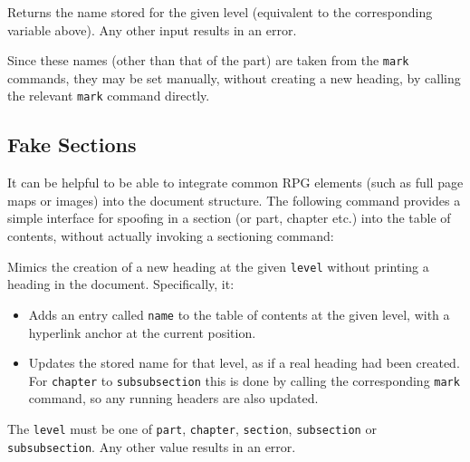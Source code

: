 

			{
				Returns the name stored for the given level (equivalent to the corresponding variable above). Any other input results in an error.

				Since these names (other than that of the part) are taken from the \texttt{mark} commands, they may be set manually, without creating a new heading, by calling the relevant \texttt{mark} command directly.
			}

		\subsection{Fake Sections}

			It can be helpful to be able to integrate common RPG elements (such as full page maps or images) into the document structure. The following command provides a simple interface for spoofing in a section (or part, chapter etc.) into the table of contents, without actually invoking a sectioning command:

			{
				Mimics the creation of a new heading at the given \texttt{level} without printing a heading in the document. Specifically, it:
				\begin{itemize}
					\item Adds an entry called \texttt{name} to the table of contents at the given level, with a hyperlink anchor at the current position.
					\item Updates the stored name for that level, as if a real heading had been created. For \texttt{chapter} to \texttt{subsubsection} this is done by calling the corresponding \texttt{mark} command, so any running headers are also updated.
				\end{itemize}
				The \texttt{level} must be one of \texttt{part}, \texttt{chapter}, \texttt{section}, \texttt{subsection} or \texttt{subsubsection}. Any other value results in an error.

			}

